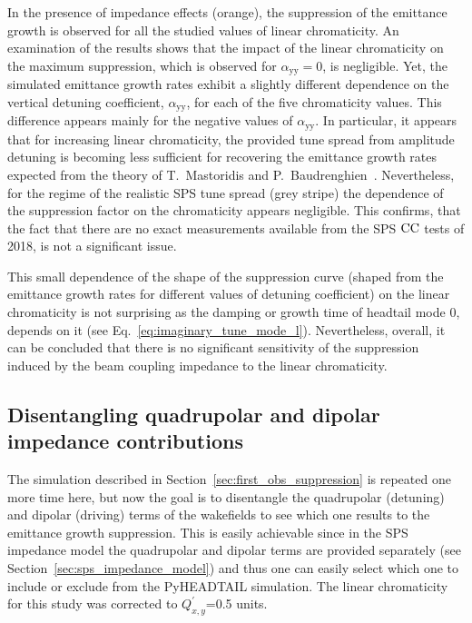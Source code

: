 In the presence of impedance effects (orange), the suppression of the emittance growth is observed for all the studied values of linear chromaticity. An examination of the results shows that the impact of the linear chromaticity on the maximum suppression, which is observed for $\alpha_\mathrm{yy}=0$, is negligible. Yet, the simulated emittance growth rates exhibit a slightly different dependence on the vertical detuning coefficient, $\alpha_\mathrm{yy}$, for each of the five chromaticity values. This difference appears mainly for the negative values of $\alpha_\mathrm{yy}$. In particular, it appears that for increasing linear chromaticity, the provided tune spread from amplitude detuning is becoming less sufficient for recovering the emittance growth rates expected from the theory of T.~Mastoridis and P.~Baudrenghien~\cite{PhysRevSTAB.18.101001}. Nevertheless, for the regime of the realistic SPS tune spread (grey stripe) the dependence of the suppression factor on the chromaticity appears negligible. This confirms, that the fact that there are no exact measurements available from the SPS ${\mathrm{CC}}$ tests of 2018, is not a significant issue. 


This small dependence of the shape of the suppression curve (shaped from the emittance growth rates for different values of detuning coefficient) on the linear chromaticity is not surprising as the damping or growth time of headtail mode 0, depends on it (see Eq.~\eqref{eq:imaginary_tune_mode_l}). Nevertheless, overall, it can be concluded that there is no significant sensitivity of the suppression induced by the beam coupling impedance to the linear chromaticity. 

\subsection{Disentangling quadrupolar and dipolar impedance contributions}\label{subsec:quad_vs_dipole}
The simulation described in Section~\ref{sec:first_obs_suppression} is repeated one more time here, but now the goal is to disentangle the quadrupolar (detuning) and dipolar (driving) terms of the wakefields to see which one results to the emittance growth suppression. This is easily achievable since in the SPS impedance model the quadrupolar and dipolar terms are provided separately (see Section~\ref{sec:sps_impedance_model}) and thus one can easily select which one to include or exclude from the PyHEADTAIL simulation. The linear chromaticity for this study was corrected to $Q^\prime_{x,y}$=0.5 units.

